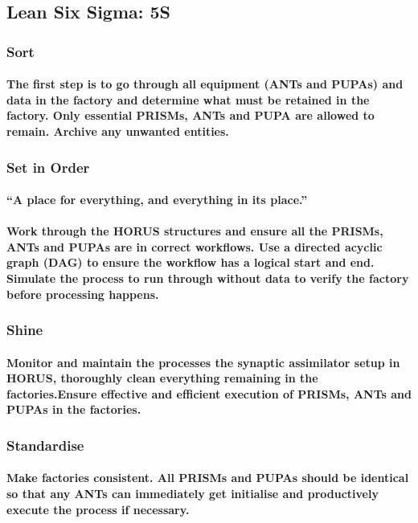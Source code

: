 \subsection{Lean Six Sigma: 5S}
\subsubsection{Sort}
\paragraph{The first step is to go through all equipment (ANTs and PUPAs) and data in the factory and determine what must be retained in the factory. Only essential PRISMs, ANTs and PUPA are allowed to remain. Archive any unwanted entities.}
\subsubsection{Set in Order}
\paragraph{“A place for everything, and everything in its place.” }
\paragraph{Work through the HORUS structures and ensure all the PRISMs, ANTs and PUPAs are in correct workflows. Use a directed acyclic graph (DAG) to ensure the workflow has a logical start and end. Simulate the process to run through without data to verify the factory before processing happens.}
\subsubsection{Shine}
\paragraph{Monitor and maintain the processes the synaptic assimilator setup in HORUS, thoroughly clean everything remaining in the factories.Ensure effective and efficient execution of PRISMs, ANTs and PUPAs in the factories.}
\subsubsection{Standardise}
\paragraph{Make factories consistent. All PRISMs and PUPAs should be identical so that any ANTs can immediately get initialise and productively execute the process if necessary.}
